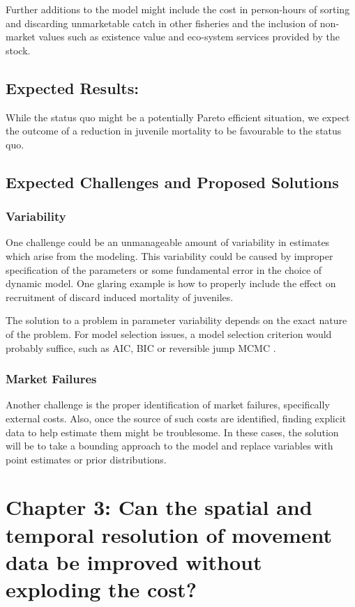 \documentclass{article}
\begin{document}
Further additions to the model might include the cost in person-hours of sorting and discarding unmarketable catch in other fisheries and the inclusion of non-market values such as existence value and eco-system services provided by the stock.

\subsection{Expected Results:} 

While the status quo might be a potentially Pareto efficient situation, we expect the outcome of a reduction in juvenile mortality to be favourable to the status quo.

\subsection{Expected Challenges and Proposed Solutions}

\subsubsection*{Variability}

One challenge could be an unmanageable amount of variability in estimates which arise from the modeling. This variability could be caused by improper specification of the parameters or some fundamental error in the choice of dynamic model. One glaring example is how to properly include the effect on recruitment of discard induced mortality of juveniles.

The solution to a problem in parameter variability depends on the exact nature of the problem. For model selection issues, a model selection criterion would probably suffice, such as AIC, BIC or reversible jump MCMC \citep{gelman2014bayesian}. 

\subsubsection*{Market Failures}

Another challenge is the proper identification of market failures, specifically external costs. Also, once the source of such costs are identified, finding explicit data to help estimate them might be troublesome. In these cases, the solution will be to take a bounding approach to the model and replace variables with point estimates or prior distributions.


\section{Chapter 3: Can the spatial and temporal resolution of movement data be improved without exploding the cost?}\label{sec:PowSim}
\end{document}
